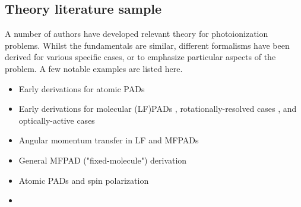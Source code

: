 \subsection{Theory literature sample\label{sec:theory-lit}}

A number of authors have developed relevant theory for photoionization problems. Whilst the fundamentals are similar, different formalisms have been derived for various specific cases, or to emphasize particular aspects of the problem. A few notable examples are listed here.

\begin{itemize}
\item Early derivations for atomic PADs \cite{Cherepkov1979,Cooper1968,Cooper1969}
\item Early derivations for molecular (LF)PADs \cite{Tully1968}, rotationally-resolved cases \cite{Buckingham1970}, and optically-active cases \cite{Ritchie1976}
\item Angular momentum transfer in LF and MFPADs \cite{Fano1972} 
\item General MFPAD ("fixed-molecule") derivation \cite{Dill1976}
\item Atomic PADs and spin polarization \cite{Klar1982}
\item 
\end{itemize}